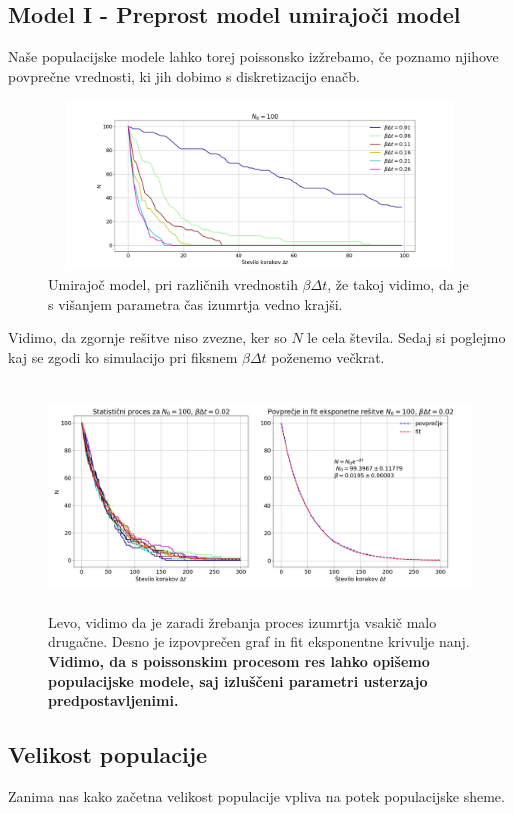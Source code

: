 \documentclass[11pt, a4paper]{article}
\begin{document}
\subsection{Model I - Preprost model umirajoči model}
Naše populacijske modele lahko torej poissonsko izžrebamo, če poznamo njihove povprečne vrednosti, ki jih dobimo s diskretizacijo enačb.
\begin{figure}[H]
\centering

  \includegraphics[width=18cm, height=4.5cm]{Umiranje_1.png}
   \caption{Umirajoč model, pri različnih vrednostih $\beta \Delta t$, že takoj vidimo, da je s višanjem parametra čas izumrtja vedno krajši.}
 \end{figure}
Vidimo, da zgornje rešitve niso zvezne, ker so $N$ le cela števila. Sedaj si poglejmo kaj se zgodi ko simulacijo pri fiksnem $\beta \Delta t$ poženemo večkrat.
\begin{figure}[H]
\centering

  \includegraphics[width=18cm, height=6cm]{Umiranje_1_statisticni_proces.png}
   \caption{Levo, vidimo da je zaradi žrebanja proces izumrtja vsakič malo drugačne. Desno je izpovprečen graf in fit eksponentne krivulje nanj. \textbf{Vidimo, da s poissonskim procesom res lahko opišemo populacijske modele, saj izluščeni parametri usterzajo predpostavljenimi.}}
  
 \end{figure}
 \subsection{Velikost populacije}
 Zanima nas kako začetna velikost populacije vpliva na potek populacijske sheme.
 
\end{document}
